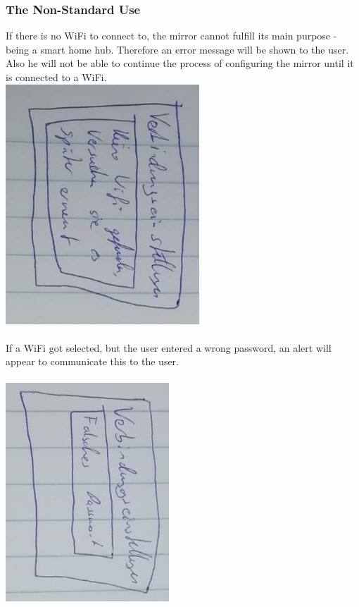 \documentclass[12pt]{article}
\theoremstyle{definition}
\begin{document}
\subsubsection{The Non-Standard Use}
If there is no WiFi to connect to, the mirror cannot fulfill its main purpose - being a smart home hub.
Therefore an error message will be shown to the user. Also he will not be able to continue the process of configuring the mirror until it is connected to a WiFi.\\
\includegraphics[angle=90, scale=.8]{UseCase/KeinWifiGefunden.jpeg}\\\\
If a WiFi got selected, but the user entered a wrong password, an alert will appear to communicate this to the user.\\\\
\includegraphics[angle=90, scale=.8]{UseCase/VerbindungFalschesPasswort.jpeg}\\
\end{document}
